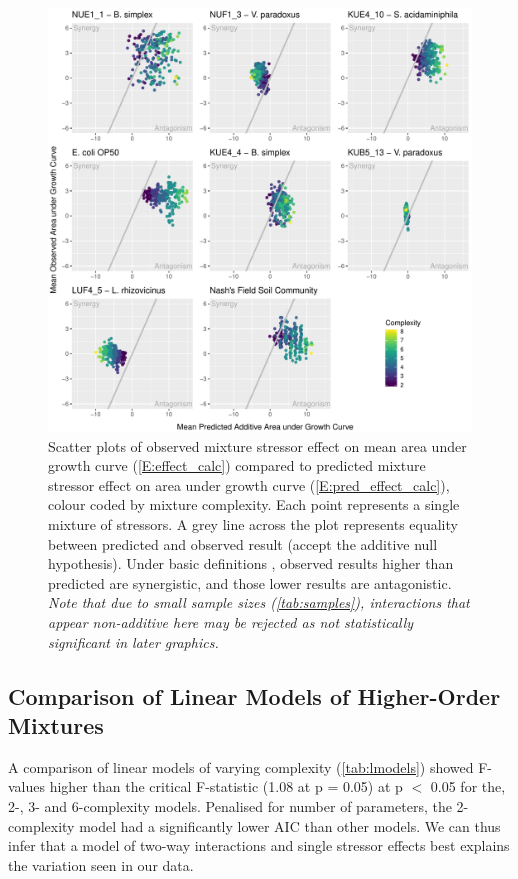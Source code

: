 \documentclass[final,1p,times]{elsarticle}
\begin{document}
\begin{figure}[H]
    \centering
    \includegraphics[width = \textwidth]{Scripts/Results/Final_Pipeline/ObservedXPredicted.pdf}
    \caption{Scatter plots of observed mixture stressor effect on mean area under growth curve (\ref{E:effect_calc}) compared to predicted mixture stressor effect on area under growth curve (\ref{E:pred_effect_calc}), colour coded by mixture complexity. Each point represents a single mixture of stressors. A grey line across the plot represents equality between predicted and observed result (accept the additive null hypothesis). Under basic definitions \cite{Bliss1939}, observed results higher than predicted are synergistic, and those lower results are antagonistic. \textit{Note that due to small sample sizes (\cref{tab:samples}), interactions that appear non-additive here may be rejected as not statistically significant in later graphics.}}
    \label{fig:obsXpred}
\end{figure}

\newpage
\subsection{Comparison of Linear Models of Higher-Order Mixtures}
\label{S:3:6}

A comparison of linear models of varying complexity (\cref{tab:lmodels}) showed F-values higher than the critical F-statistic (1.08 at p = 0.05) at p $<$ 0.05 for the, 2-, 3- and 6-complexity models. Penalised for number of parameters, the 2-complexity model had a significantly lower AIC than other models. We can thus infer that a model of two-way interactions and single stressor effects best explains the variation seen in our data.
\end{document}
